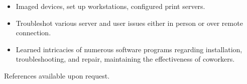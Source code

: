 \documentclass[11pt]{article}
\begin{document}
{%
    \begin{itemize}[noitemsep,nolistsep]
        \item Imaged devices, set up workstations, configured print servers. 
        \item Troubleshot various server and user issues either in person or over remote connection.
        \item Learned intricacies of numerous software programs regarding installation, troubleshooting, and repair, maintaining the effectiveness of coworkers. 
    \end{itemize}
    \vspace{3mm}

\vspace{-2mm}
{\fontsize{8}{10}\robotocondlight References available upon request.}
}
\hsep
\end{document}
